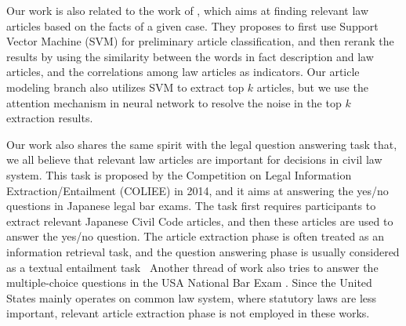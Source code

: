 
Our work is also related to the work of \cite{liu2015predicting}, which aims at finding relevant law articles based on the facts of a given case. They proposes to first use Support Vector Machine (SVM) for preliminary article classification, and then 
rerank the results by using the similarity between the words in fact description and law articles, and the correlations among law articles as indicators.
Our article modeling branch also utilizes SVM to extract top $k$ articles, but we use the attention mechanism in neural network to resolve the noise in the top $k$ extraction results.

Our work also shares the same spirit with the legal question answering task that, we all believe that relevant law articles are important for decisions in civil law system. This task is proposed by the Competition on Legal Information Extraction/Entailment (COLIEE) in 2014,
and it aims at answering the yes/no questions in Japanese legal bar exams. The task first requires participants to extract relevant Japanese Civil Code articles, and then these articles are used to answer the yes/no question. 
The article extraction phase is often treated as an information retrieval task, and the question answering phase is usually considered as a textual entailment task~\cite{kim2014legal,kimconvolutional}
Another thread of work also tries to answer the multiple-choice questions in the USA National Bar Exam \cite{FAWEI16,adebayoneural}. Since the United States mainly operates on common law system, where statutory laws are less important, relevant article extraction phase is not employed in these works.